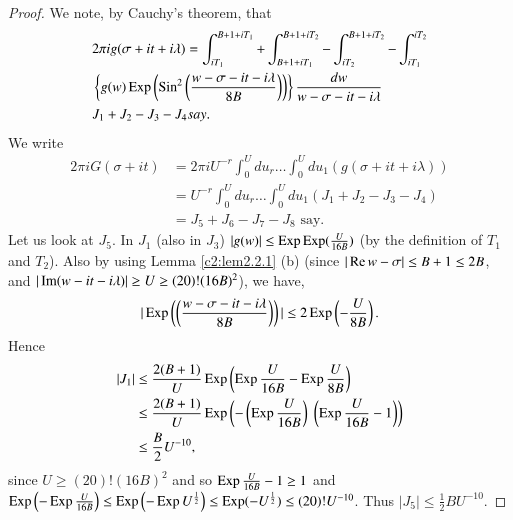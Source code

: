 \begin{proof}
We note, by Cauchy's theorem, that
\begin{align*}
& 2 \pi i g (\sigma + it + i \lambda) = \int^{B+1+iT_1}_{iT_1} + \int^{B+1+iT_2}_{B+1+iT_1} - \int^{B+1+iT_2}_{iT_2} - \int^{iT_2}_{iT_1}\\
& \left\{g(w) \operatorname{Exp} \left(\operatorname{Sin}^2 \left(\frac{w-\sigma - it -i\lambda}{8B} \right) \right) \right\} \frac{dw}{w-\sigma - it -i\lambda}\\
& J_1 + J_2 - J_3 - J_4 say.
\end{align*}
We write
\begin{align*}
2 \pi i G (\sigma + it) & = 2\pi i U^{-r} \int^U_0 du_r \ldots \int^U_0 du_1 (g(\sigma + it + i\lambda))\\
& = U^{-r} \int^U_0 du_r \ldots \int^U_0 du_1 (J_1 + J_2 - J_3 - J_4)\\
& = J_5 + J_6 - J_7 - J_8 \text{ say}.
\end{align*}
Let us look at $J_5$. In $J_1$ (also in $J_3$) $|g(w)|\leq \operatorname{Exp} \operatorname{Exp} (\frac{U}{16B})$ (by the definition of $T_1$ and $T_2$). Also by using Lemma \ref{c2:lem2.2.1} (b) (since $|\operatorname{Re} w-\sigma| \leq B + 1 \leq 2 B$, and $|\operatorname{Im} (w - it - i \lambda)| \geq U \geq (20)!(16B)^2$), we have,
$$
|\operatorname{Exp} \left( \left( \frac{w-\sigma - it -i\lambda}{8B}\right)\right)| \leq 2 \operatorname{Exp} \left(- \frac{U}{8B}\right).
$$
Hence
\begin{align*}
|J_1| & \leq \frac{2(B+1)}{U} \operatorname{Exp} \left(\operatorname{Exp} \frac{U}{16B} - \operatorname{Exp} \frac{U}{8B} \right)\\
& \leq \frac{2(B+1)}{U} \operatorname{Exp} \left(- \left(\operatorname{Exp} \frac{U}{16B} \right) \; \left( \operatorname{Exp} \frac{U}{16B} -1\right) \right)\\
& \leq \frac{B}{2} U^{-10},
\end{align*}
since $U \geq (20)!(16 B)^2$ and so $\operatorname{Exp} \frac{U}{16B} -1 \geq 1$ and $\operatorname{Exp} \left(-\operatorname{Exp} \frac{U}{16B} \right) \leq \operatorname{Exp} \left( -\operatorname{Exp} U^{\frac{1}{2}}\right) \leq \operatorname{Exp} (-U^{\frac{1}{2}}) \leq (20)! U^{-10}$. Thus $|J_5| \leq \frac{1}{2} BU^{-10}$. 


\end{proof}
